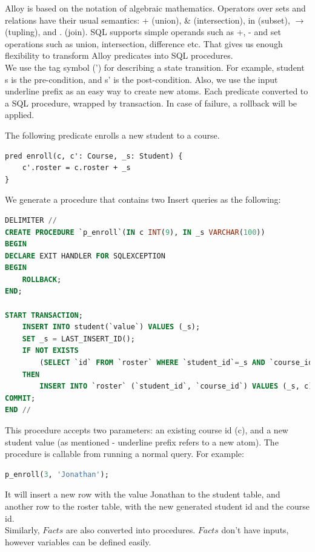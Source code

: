 \documentclass[oneside]{book}
\begin{document}
Alloy is based on the notation of algebraic mathematics. Operators over sets and relations have their usual semantics: + (union), \& (intersection), in (subset), $\rightarrow$ (tupling), and . (join). SQL supports simple operands such as +, - and set operations such as union, intersection, difference etc. That gives us enough flexibility to transform Alloy predicates into SQL procedures.\cite{sqlalgebra}\\

We use the tag symbol (') for describing a state transition. For example, student s is the pre-condition, and s' is the post-condition. Also, we use the input underline prefix as an easy way to create new atoms. Each predicate converted to a SQL procedure, wrapped by transaction. In case of failure, a rollback will be applied.

The following predicate enrolls a new student to a course. 
\begin{lstlisting}
pred enroll(c, c': Course, _s: Student) {
	c'.roster = c.roster + _s
}
\end{lstlisting}

We generate a procedure that contains two Insert queries as the following:
\begin{lstlisting}[escapechar=@,language=SQL]
DELIMITER //
CREATE PROCEDURE `p_enroll`(IN c INT(9), IN _s VARCHAR(100))
BEGIN
DECLARE EXIT HANDLER FOR SQLEXCEPTION
BEGIN
	ROLLBACK;
END;

START TRANSACTION;
	INSERT INTO student(`value`) VALUES (_s);
	SET _s = LAST_INSERT_ID();
	IF NOT EXISTS 
		(SELECT `id` FROM `roster` WHERE `student_id`=_s AND `course_id`=c) 
	THEN
		INSERT INTO `roster` (`student_id`, `course_id`) VALUES (_s, c);
COMMIT;
END //
\end{lstlisting}

This procedure accepts two parameters: an existing course id (c), and a new student value (as mentioned - underline prefix refers to a new atom). The procedure is callable from running a normal query. For example:

\begin{lstlisting}[escapechar=@,language=SQL]
p_enroll(3, 'Jonathan');
\end{lstlisting}

It will insert a new row with the value Jonathan to the student table, and another row to the roster table, with the new generated student id and the course id.\\

Similarly, $Facts$ are also converted into procedures. $Facts$ don't have inputs, however variables can be defined easily.
\end{document}
